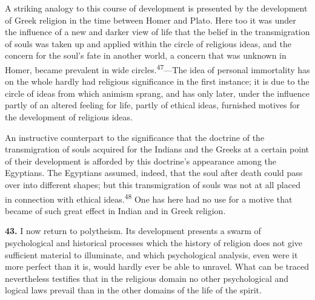 \documentclass[12pt,a4paper]{book}
\newcommand{\opage}[1]{\marginnote{\footnotesize\textit{[#1]}}}
\begin{document}
A striking analogy to this course of development is presented by the development of Greek
religion in the time between Homer and Plato. Here too it was under the influence of a new and
darker view of life that the belief in the transmigration of souls was taken up and applied
within the circle of religious ideas, and the concern for the soul's fate in another world, a
concern that was unknown in Homer, became prevalent in wide circles.\textsuperscript{47}---The
idea of personal immortality has on the whole hardly had religious significance in the first
instance; it is due to the circle of ideas from which animism sprang, and has only later, under
the 
\opage{100}influence partly of an altered feeling for life, partly of ethical ideas, furnished motives
for the development of religious ideas.

An instructive counterpart to the significance that the doctrine of the transmigration of souls
acquired for the Indians and the Greeks at a certain point of their development is afforded by
this doctrine's appearance among the Egyptians. The Egyptians assumed, indeed, that the soul
after death could pass over into different shapes; but this transmigration of souls was not at
all placed in connection with ethical ideas.\textsuperscript{48} One has here had no use for a
motive that became of such great effect in Indian and in Greek religion.

\medskip

\noindent\textbf{43.} I now return to polytheism. Its development presents a swarm of
psychological and historical processes which the history of religion does not give sufficient
material to illuminate, and which psychological analysis, even were it more perfect than it is,
would hardly ever be able to unravel. What can be traced nevertheless testifies that in the
religious domain no other psychological and logical laws prevail than in the other domains of
the life of the spirit.
\end{document}
